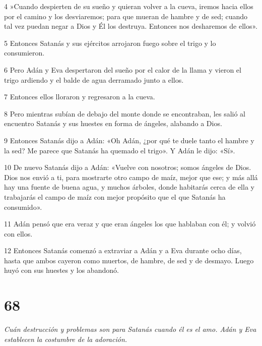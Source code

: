 \par 4 »Cuando despierten de su sueño y quieran volver a la cueva, iremos hacia ellos por el camino y los desviaremos; para que mueran de hambre y de sed; cuando tal vez puedan negar a Dios y Él los destruya. Entonces nos desharemos de ellos».

\par 5 Entonces Satanás y sus ejércitos arrojaron fuego sobre el trigo y lo consumieron.

\par 6 Pero Adán y Eva despertaron del sueño por el calor de la llama y vieron el trigo ardiendo y el balde de agua derramado junto a ellos.

\par 7 Entonces ellos lloraron y regresaron a la cueva.

\par 8 Pero mientras subían de debajo del monte donde se encontraban, les salió al encuentro Satanás y sus huestes en forma de ángeles, alabando a Dios.

\par 9 Entonces Satanás dijo a Adán: «Oh Adán, ¿por qué te duele tanto el hambre y la sed? Me parece que Satanás ha quemado el trigo». Y Adán le dijo: «Sí».

\par 10 De nuevo Satanás dijo a Adán: «Vuelve con nosotros; somos ángeles de Dios. Dios nos envió a ti, para mostrarte otro campo de maíz, mejor que ese; y más allá hay una fuente de buena agua, y muchos árboles, donde habitarás cerca de ella y trabajarás el campo de maíz con mejor propósito que el que Satanás ha consumido».

\par 11 Adán pensó que era veraz y que eran ángeles los que hablaban con él; y volvió con ellos.

\par 12 Entonces Satanás comenzó a extraviar a Adán y a Eva durante ocho días, hasta que ambos cayeron como muertos, de hambre, de sed y de desmayo. Luego huyó con sus huestes y los abandonó.

\chapter{68}

\par \textit{Cuán destrucción y problemas son para Satanás cuando él es el amo. Adán y Eva establecen la costumbre de la adoración.}

